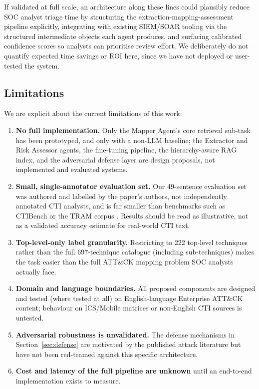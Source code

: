 \documentclass[runningheads]{llncs}
\begin{document}
If validated at full scale, an architecture along these lines could plausibly reduce SOC analyst triage time by structuring the extraction-mapping-assessment pipeline explicitly, integrating with existing SIEM/SOAR tooling via the structured intermediate objects each agent produces, and surfacing calibrated confidence scores so analysts can prioritise review effort. We deliberately do not quantify expected time savings or ROI here, since we have not deployed or user-tested the system.

\subsection{Limitations}

We are explicit about the current limitations of this work:
\begin{enumerate}
    \item \textbf{No full implementation.} Only the Mapper Agent's core retrieval sub-task has been prototyped, and only with a non-LLM baseline; the Extractor and Risk Assessor agents, the fine-tuning pipeline, the hierarchy-aware RAG index, and the adversarial defense layer are design proposals, not implemented and evaluated systems.
    \item \textbf{Small, single-annotator evaluation set.} Our 49-sentence evaluation set was authored and labelled by the paper's authors, not independently annotated CTI analysts, and is far smaller than benchmarks such as CTIBench \cite{ctibench2024} or the TRAM corpus \cite{tramtool}. Results should be read as illustrative, not as a validated accuracy estimate for real-world CTI text.
    \item \textbf{Top-level-only label granularity.} Restricting to 222 top-level techniques rather than the full 697-technique catalogue (including sub-techniques) makes the task easier than the full ATT\&CK mapping problem SOC analysts actually face.
    \item \textbf{Domain and language boundaries.} All proposed components are designed and tested (where tested at all) on English-language Enterprise ATT\&CK content; behaviour on ICS/Mobile matrices or non-English CTI sources is untested.
    \item \textbf{Adversarial robustness is unvalidated.} The defense mechanisms in Section~\ref{sec:defense} are motivated by the published attack literature but have not been red-teamed against this specific architecture.
    \item \textbf{Cost and latency of the full pipeline are unknown} until an end-to-end implementation exists to measure.
\end{enumerate}
\end{document}

